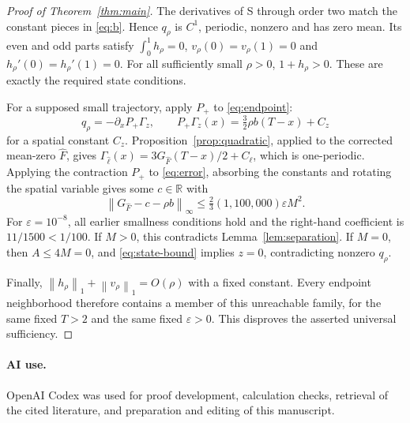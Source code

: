 \documentclass[11pt]{article}
\newcommand{\norm}[1]{\left\|#1\right\|}
\begin{document}
\begin{proof}[Proof of Theorem~\ref{thm:main}]
The derivatives of S through order two match the constant pieces in
\eqref{eq:b}. Hence $q_\rho$ is $C^1$, periodic, nonzero and has zero mean.
Its even and odd parts satisfy
$\int_0^1h_\rho=0$, $v_\rho(0)=v_\rho(1)=0$ and
$h_\rho'(0)=h_\rho'(1)=0$. For all sufficiently small $\rho>0$,
$1+h_\rho>0$. These are exactly the required state conditions.

For a supposed small trajectory, apply $P_+$ to \eqref{eq:endpoint}:
\[
q_\rho=-\partial_xP_+\Gamma_z,
\qquad P_+\Gamma_z(x)=\tfrac32\rho b(T-x)+C_z
\]
for a spatial constant $C_z$. Proposition~\ref{prop:quadratic}, applied to
the corrected mean-zero $\widehat F$, gives
$\Gamma_{\widehat\ell}(x)=3G_{\widehat F}(T-x)/2+C_\ell$, which is
one-periodic. Applying the contraction $P_+$ to \eqref{eq:error}, absorbing
the constants and rotating the spatial variable gives some $c\in\mathbb R$
with
\[
\norm{G_{\widehat F}-c-\rho b}_\infty
\le\tfrac23(1{,}100{,}000)\varepsilon M^2.
\]
For $\varepsilon=10^{-8}$, all earlier smallness conditions hold and the
right-hand coefficient is $11/1500<1/100$. If $M>0$, this contradicts
Lemma~\ref{lem:separation}. If $M=0$, then $A\le4M=0$, and
\eqref{eq:state-bound} implies $z=0$, contradicting nonzero $q_\rho$.

Finally, $\norm{h_\rho}_1+\norm{v_\rho}_1=O(\rho)$ with a fixed constant.
Every endpoint neighborhood therefore contains a member of this unreachable
family, for the same fixed $T>2$ and the same fixed $\varepsilon>0$.
This disproves the asserted universal sufficiency.
\end{proof}

\paragraph{AI use.}
OpenAI Codex was used for proof development, calculation checks, retrieval of
the cited literature, and preparation and editing of this manuscript.
\end{document}
